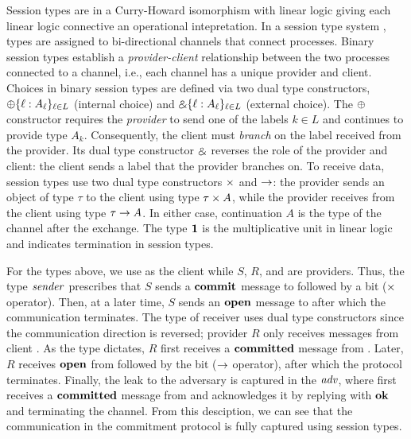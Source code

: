 Session types are in a Curry-Howard isomorphism \cite{caires2010session} with
linear logic \cite{girard1987linear} giving each linear logic connective
an operational intepretation.
In a session type system \cite{HondaCONCUR1993,Scalas19POPL,HondaPOPL2008},
types are assigned to bi-directional channels that connect processes.
Binary session types \cite{PfenningFOSSACS2015,Das20FSCD}
establish a \emph{provider-client} relationship between the two processes connected
to a channel, i.e., each channel has a unique provider and client.
Choices in binary session types are defined via two dual type constructors,
$\oplus \{ \ell : A_\ell \}_{\ell \in L}$ (internal choice) and $\mathbin{\binampersand} \{ \ell : A_\ell \}_{\ell \in L}$
(external choice).
The $\oplus$ constructor requires the \emph{provider} to send one of the labels $k \in L$
and continues to provide type $A_k$.
Consequently, the client must \emph{branch} on the label received from the provider.
Its dual type constructor $\mathbin{\binampersand}$ reverses the role of the provider and client:
the client sends a label that the provider branches on.
To receive data, session types use two dual type constructors $\times$ and $\rightarrow$:
the provider sends an object of type $\tau$ to the client using type $\tau \times A$,
while the provider receives from the client using type $\tau \rightarrow A$.
In either case, continuation $A$ is the type of the channel after the exchange.
The type $\mathbf{1}$ is the multiplicative unit in linear logic and indicates
termination in session types.

For the types above, we use \Fcom as the client while $S$, $R$, and \A are providers.
Thus, the type $\relax{\it sender}$ prescribes that $S$ sends a $\mathbf{commit}$ message to \Fcom
followed by a bit ($\times$ operator).
Then, at a later time, $S$ sends an $\mathbf{open}$ message to \Fcom after which the communication terminates.
The type of receiver uses dual type constructors since the communication direction is reversed;
provider $R$ only receives messages from client \Fcom.
As the type dictates, $R$ first receives a $\mathbf{committed}$ message from \Fcom.
Later, $R$ receives $\mathbf{open}$ from \Fcom followed by the bit ($\rightarrow$ operator), after
which the protocol terminates.
Finally, the leak to the adversary is captured in the $\relax{\it adv}$, where \A first receives
a $\mathbf{committed}$ message from \Fcom and acknowledges it by replying with $\mathbf{ok}$
and terminating the channel.
From this desciption, we can see that the communication in the commitment protocol is fully captured
using session types.

